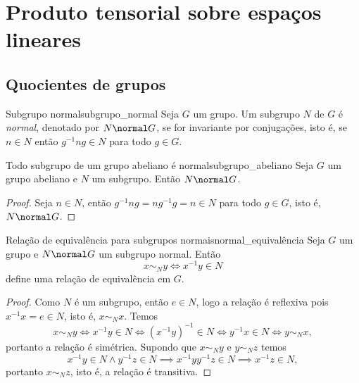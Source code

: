 \section{Produto tensorial sobre espaços lineares}
\subsection{Quocientes de grupos}
\begin{definition}{Subgrupo normal}{subgrupo_normal}
    Seja \(G\) um grupo. Um subgrupo \(N\) de \(G\) é \emph{normal}, denotado por \(N \normal G\), se for invariante por conjugações, isto é, se \(n \in N\) então \(g^{-1} n g \in N\) para todo \(g \in G\).
\end{definition}

\begin{proposition}{Todo subgrupo de um grupo abeliano é normal}{subgrupo_abeliano}
    Seja \(G\) um grupo abeliano e \(N\) um subgrupo. Então \(N \normal G\).
\end{proposition}
\begin{proof}
    Seja \(n \in N\), então \(g^{-1}ng = ng^{-1}g = n \in N\) para todo \(g \in G\), isto é, \(N \normal G\).
\end{proof}

\begin{proposition}{Relação de equivalência para subgrupos normais}{normal_equivalência}
    Seja \(G\) um grupo e \(N \normal G\) um subgrupo normal. Então
    \begin{equation*}
        x \sim_N y \iff x^{-1}y \in N
    \end{equation*}
    define uma relação de equivalência em \(G\).
\end{proposition}
\begin{proof}
    Como \(N\) é um subgrupo, então \(e \in N\), logo a relação é reflexiva pois \(x^{-1}x = e \in N\), isto é, \(x \sim_N x\). Temos
    \begin{equation*}
        x \sim_N y \iff x^{-1} y \in N \iff (x^{-1}y)^{-1} \in N \iff y^{-1}x \in N \iff y \sim_N x,
    \end{equation*}
    portanto a relação é simétrica. Supondo que \(x \sim_N y\) e \(y \sim_N z\) temos
    \begin{equation*}
        x^{-1}y \in N \land y^{-1}z \in N \implies x^{-1}y y^{-1} z \in N \implies x^{-1} z \in N,
    \end{equation*}
    portanto \(x \sim_N z\), isto é, a relação é transitiva.
\end{proof}

